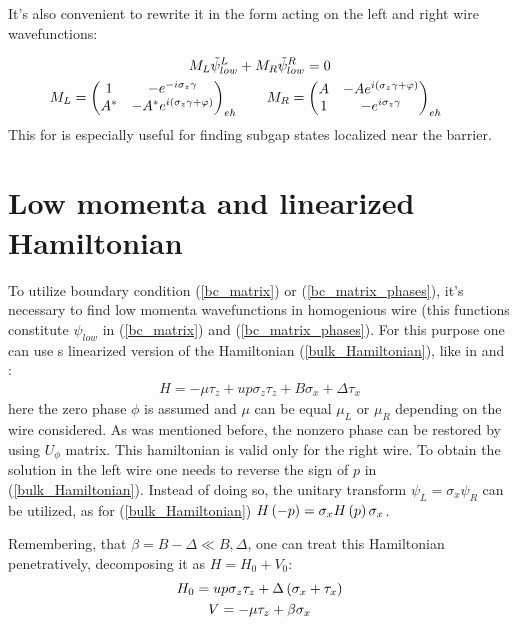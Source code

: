 It's also convenient to rewrite it in the form acting on the left and right wire wavefunctions: 

\begin{gather}
\label{bc_matrix_LR}
M_L\tilde{\psi}_{low}^L
+
M_R\tilde{\psi}_{low}^R
=
0
\nonumber
\\
M_L
=
	\begin{pmatrix}
	1 & -e^{-i\sigma_z\gamma}
	\\
	A^* & -A^* e^{i\left(\sigma_z\gamma+\varphi\right)}
	\end{pmatrix}_{eh}
	\qquad
M_R
=
	\begin{pmatrix}
	A & -A e^{i\left(\sigma_z\gamma+\varphi\right)}
	\\
1 & -e^{i\sigma_z\gamma}
\end{pmatrix}_{eh}
\qquad	
\end{gather}
This for is especially useful for finding subgap states localized near the barrier.
\section{Low momenta and linearized Hamiltonian}
\label{sec:linearized_hamiltonian}

To utilize boundary condition (\ref{bc_matrix}) or (\ref{bc_matrix_phases}), it's necessary to find low momenta wavefunctions in homogenious wire (this functions constitute $ \psi_{low}$ in (\ref{bc_matrix}) and (\ref{bc_matrix_phases}). For this purpose one can use s linearized version of the Hamiltonian (\ref{bulk_Hamiltonian}), like in \cite{Oreg_2010} and \cite{Lutchyn_2010}:
\begin{gather}
\label{linearized_hamiltonian}
		H
	=
	-\mu \tau_z
	+
	u p \sigma_z \tau_z
	+
	B\sigma_x	
	+
	\Delta\tau_x
\end{gather}
here the zero phase $ \phi $ is assumed and $ \mu $ can be equal $ \mu_L $ or $ \mu_R $ depending on the wire considered. As was mentioned before, the nonzero phase can be restored by using $ U_\phi $ matrix. This hamiltonian is valid only for the right wire. To obtain the solution in the left wire one needs to reverse the sign of $ p $ in (\ref{bulk_Hamiltonian}). Instead of doing so, the unitary transform $ \psi_L=\sigma_x\psi_R $ can be utilized, as for (\ref{bulk_Hamiltonian}) $ H\left(-p\right)=\sigma_x H\left(p\right)\sigma_x $.

Remembering, that $ \beta=B-\Delta\ll B, \Delta $, one can	treat this Hamiltonian penetratively, decomposing it as $ H=H_0+V_0$:
\begin{gather}
	H_0=
	u p \sigma_z \tau_z
	+
	\Delta
	\left(\sigma_x	
	+
	\tau_x\right)
\\
V=-\mu \tau_z+\beta\sigma_x
\end{gather}

